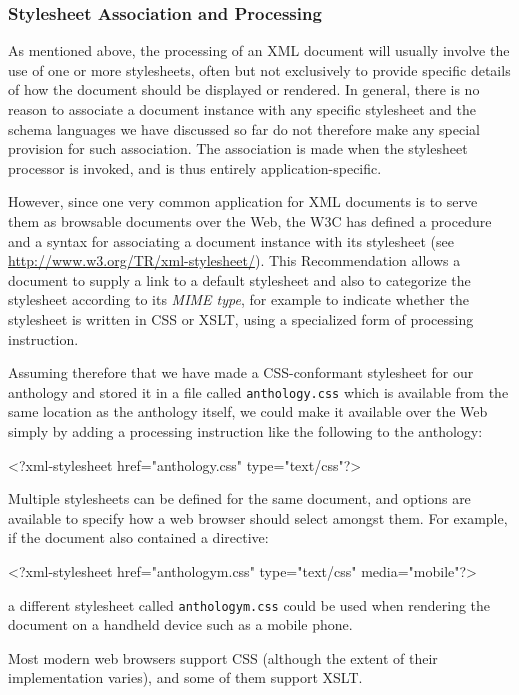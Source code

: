 \subsubsection[{Stylesheet Association and Processing}]{Stylesheet Association and Processing}\label{SG-style}\par
As mentioned above, the processing of an XML document will usually involve the use of one or more stylesheets, often but not exclusively to provide specific details of how the document should be displayed or rendered. In general, there is no reason to associate a document instance with any specific stylesheet and the schema languages we have discussed so far do not therefore make any special provision for such association. The association is made when the stylesheet processor is invoked, and is thus entirely application-specific.\par
However, since one very common application for XML documents is to serve them as browsable documents over the Web, the W3C has defined a procedure and a syntax for associating a document instance with its stylesheet (see \url{http://www.w3.org/TR/xml-stylesheet/}). This Recommendation allows a document to supply a link to a default stylesheet and also to categorize the stylesheet according to its \textit{MIME type}, for example to indicate whether the stylesheet is written in CSS or XSLT, using a specialized form of processing instruction.\par
Assuming therefore that we have made a CSS-conformant stylesheet for our anthology and stored it in a file called \texttt{anthology.css} which is available from the same location as the anthology itself, we could make it available over the Web simply by adding a processing instruction like the following to the anthology: \par\hfill\bgroup\exampleFont\vskip 10pt\begin{shaded}
\obeyspaces <?xml-stylesheet href="anthology.css" type="text/css"?>\end{shaded}
\par\egroup 
\par
Multiple stylesheets can be defined for the same document, and options are available to specify how a web browser should select amongst them. For example, if the document also contained a directive: \par\hfill\bgroup\exampleFont\vskip 10pt\begin{shaded}
\obeyspaces <?xml-stylesheet href="anthology\textunderscore m.css" type="text/css" media="mobile"?>\end{shaded}
\par\egroup 
a different stylesheet called \texttt{anthology\textunderscore m.css} could be used when rendering the document on a handheld device such as a mobile phone.\par
Most modern web browsers support CSS (although the extent of their implementation varies), and some of them support XSLT.
